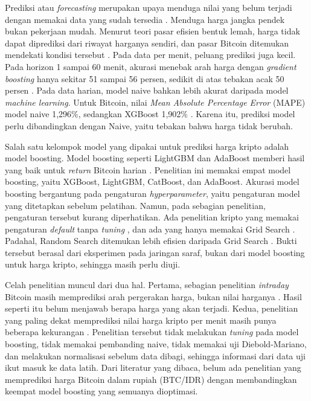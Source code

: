 Prediksi atau \textit{forecasting} merupakan upaya menduga nilai yang belum
terjadi dengan memakai data yang sudah tersedia \cite{hyndman2014fpp}.
Menduga harga jangka pendek bukan pekerjaan mudah. Menurut teori pasar efisien
bentuk lemah, harga tidak dapat diprediksi dari riwayat harganya sendiri, dan
pasar Bitcoin ditemukan mendekati kondisi tersebut \cite{yi2023}. Pada data per menit, peluang prediksi juga kecil. Pada horizon 1 sampai 60 menit, akurasi menebak arah harga dengan \textit{gradient boosting}
hanya sekitar 51 sampai 56 persen, sedikit di atas tebakan acak 50 persen
\cite{jaquart2021}. Pada data harian, model naive bahkan
lebih akurat daripada model \textit{machine learning}. Untuk Bitcoin, nilai \textit{Mean Absolute Percentage Error} (MAPE)
model naive 1,296\%, sedangkan XGBoost 1,902\% \cite{puoti2024}. Karena itu,
prediksi model perlu dibandingkan dengan Naive, yaitu tebakan bahwa harga
tidak berubah.

Salah satu kelompok model yang dipakai untuk prediksi harga kripto
adalah model boosting. Model boosting seperti LightGBM dan AdaBoost memberi
hasil yang baik untuk \textit{return} Bitcoin harian \cite{bouteska2024}.
Penelitian ini memakai empat model boosting, yaitu XGBoost, LightGBM,
CatBoost, dan AdaBoost. Akurasi model boosting bergantung pada
pengaturan \textit{hyperparameter}, yaitu pengaturan model yang ditetapkan
sebelum pelatihan. Namun, pada sebagian penelitian, pengaturan tersebut kurang
diperhatikan. Ada penelitian kripto yang memakai pengaturan \textit{default} tanpa \textit{tuning} \cite{rodrigues2025}, dan ada yang hanya memakai Grid Search
\cite{bouteska2024,jaquart2021}. Padahal, Random Search ditemukan lebih
efisien daripada Grid Search \cite{bergstra2012}. Bukti tersebut berasal dari
eksperimen pada jaringan saraf, bukan dari model boosting untuk harga kripto,
sehingga masih perlu diuji.

Celah penelitian muncul dari dua hal. Pertama, sebagian penelitian
\textit{intraday} Bitcoin masih memprediksi arah pergerakan harga, bukan nilai
harganya \cite{akyildirim2023}. Hasil seperti itu belum menjawab berapa
harga yang akan terjadi. Kedua, penelitian yang paling dekat memprediksi nilai
harga kripto per menit masih punya beberapa kekurangan \cite{rodrigues2025}.
Penelitian tersebut tidak melakukan \textit{tuning} pada model boosting, tidak memakai pembanding
naive, tidak memakai uji Diebold-Mariano, dan melakukan normalisasi sebelum data dibagi, sehingga informasi dari data uji ikut masuk ke data latih. Dari literatur yang dibaca, belum ada penelitian yang memprediksi harga Bitcoin dalam rupiah (BTC/IDR) dengan membandingkan
keempat model boosting yang semuanya dioptimasi.

